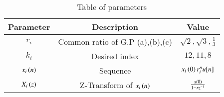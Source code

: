 \begin{table}[ht]
\renewcommand\thetable{1}
\begin{tabular}{|c|c|c|}
    \hline 
    \textbf{Parameter}&\textbf{Description} &\textbf{Value}\\
    \hline 
    $r_i$ & Common ratio of G.P (a),(b),(c) & $\sqrt{2}, \sqrt{3}, \frac{1}{3}$ \\
    \hline
    $k_i$ & Desired index & $12, 11, 8$ \\
    \hline 
    $x_i\left(n\right)$ & Sequence & $x_i\left(0\right)r_i^nu[n]$ \\
    \hline 
	$X_i\left(z\right)$ & Z-Transform of $x_i\left(n\right)$ & $\frac{x\left(0\right)}{1-rz^{-1}}$ \\
    \hline
\end{tabular}

\caption{Table of parameters}
\label{Table:1}
\end{table}
